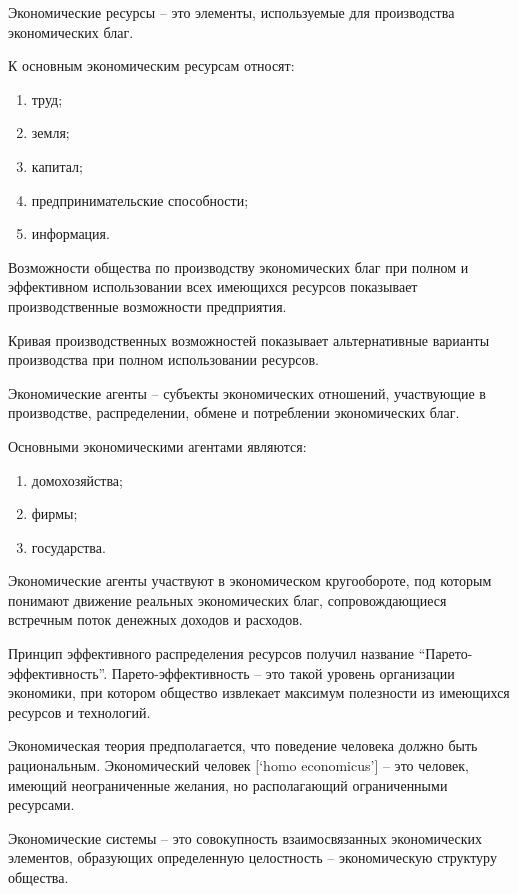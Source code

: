 Экономические ресурсы -- это элементы, используемые для производства
экономических благ.

К основным экономическим ресурсам относят:  
\begin{enumerate}
    \item труд;
    \item земля;
    \item капитал;
    \item предпринимательские способности;
    \item информация.
\end{enumerate}

Возможности общества по производству экономических благ при полном и эффективном
использовании всех имеющихся ресурсов показывает производственные возможности
предприятия.


Кривая производственных возможностей показывает альтернативные варианты
производства при полном использовании ресурсов.

Экономические агенты -- субъекты экономических отношений, участвующие в
производстве, распределении, обмене и потреблении экономических благ.

Основными экономическими агентами являются:
\begin{enumerate}
    \item домохозяйства;
    \item фирмы;
    \item государства.
\end{enumerate}

Экономические агенты участвуют в экономическом кругообороте, под которым
понимают движение реальных экономических благ, сопровождающиеся встречным поток
денежных доходов и расходов.


Принцип эффективного распределения ресурсов получил название
``Парето-эффективность''. Парето-эффективность -- это такой уровень организации
экономики, при котором общество извлекает максимум полезности из имеющихся
ресурсов и технологий.

Экономическая теория предполагается, что поведение человека должно быть
рациональным. Экономический человек [`homo economicus'] -- это человек, имеющий
неограниченные желания, но располагающий ограниченными ресурсами.

Экономические системы -- это совокупность взаимосвязанных экономических
элементов, образующих определенную целостность -- экономическую структуру
общества.

